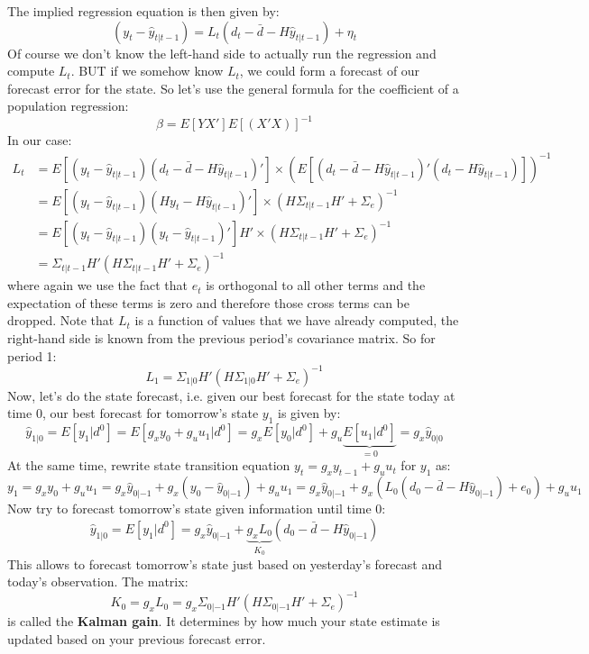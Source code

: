 \begin{enumerate}
	The implied regression equation is then given by:
	$$(y_t-\hat{y}_{t|t-1}) = L_t (d_t - \bar{d} - H \hat{y}_{t|t-1}) + \eta_t$$
	Of course we don't know the left-hand side to actually run the regression and compute $L_t$. BUT if we somehow know $L_t$, we could form a forecast of our forecast error for the state. So let's use the general formula for the coefficient of a population regression:
	$$\beta = E[YX']E[(X'X)]^{-1} $$	
	In our case:
	\begin{align*}
	L_t &= E\left[ (y_t-\hat{y}_{t|t-1}) (d_t - \bar{d} - H \hat{y}_{t|t-1})' \right] \times \left(E\left[ (d_t - \bar{d} - H \hat{y}_{t|t-1})' (d_t - H \hat{y}_{t|t-1})\right]\right)^{-1}
	\\
	&=E\left[ (y_t-\hat{y}_{t|t-1}) (H y_t - H \hat{y}_{t|t-1})' \right] \times \left( H\Sigma_{t|t-1}H'+\Sigma_e\right)^{-1}
	\\
	&=E\left[ (y_t-\hat{y}_{t|t-1}) (y_t - \hat{y}_{t|t-1})'\right]H' \times \left( H\Sigma_{t|t-1}H'+\Sigma_e\right)^{-1}
	\\
	&= \Sigma_{t|t-1} H'(H\Sigma_{t|t-1}H' + \Sigma_e)^{-1}
	\end{align*}
	where again we use the fact that $e_t$ is orthogonal to all other terms and the expectation of these terms is zero and therefore those cross terms can be dropped. Note that $L_t$ is a function of values that we have already computed, the right-hand side is known from the previous period's covariance matrix. So for period 1:
	$$L_1 = \Sigma_{1|0} H'(H\Sigma_{1|0}H' + \Sigma_e)^{-1}$$
	Now, let's do the state forecast, i.e. given our best forecast for the state today at time 0, our best forecast for tomorrow's state $y_1$ is given by:
	$$\hat{y}_{1|0} = E[y_1|d^0] = E[g_x y_0 + g_u u_1|d^0] = g_x E[ y_0|d^0] + g_u \underbrace{E[u_1|d^0]}_{=0} = g_x \hat{y}_{0|0}$$
	At the same time, rewrite state transition equation $y_t = g_x y_{t-1} + g_u u_t$ for $y_1$ as:
	$$y_1 = g_x y_{0} + g_u u_1 = g_x \hat{y}_{0|-1} + g_x(y_0-\hat{y}_{0|-1}) + g_u u_1 = g_x \hat{y}_{0|-1} + g_x\left(L_0\left(d_0-\bar{d}-H\hat{y}_{0|-1}\right)+e_0\right) + g_u u_1$$
	Now try to forecast tomorrow's state given information until time 0:
	$$\hat{y}_{1|0} = E[y_1|d^0] = g_x \hat{y}_{0|-1} + \underbrace{g_x L_0}_{K_0}\left(d_0-\bar{d}-H\hat{y}_{0|-1}\right)$$
	This allows to forecast tomorrow's state just based on yesterday's forecast and today's observation. The matrix:
		$$K_0 = g_x L_0 = g_x \Sigma_{0|-1} H'(H\Sigma_{0|-1}H' + \Sigma_e)^{-1}$$
	is called the \textbf{Kalman gain}. It determines by how much your state estimate is updated based on your previous forecast error.


\end{enumerate}

